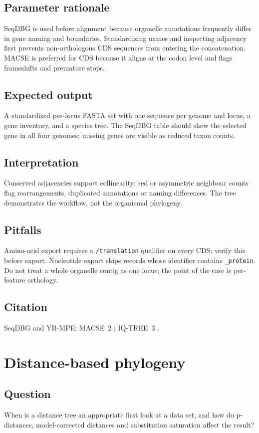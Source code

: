 \documentclass[11pt]{report}
\begin{document}
\section{Parameter rationale}
SeqDBG is used before alignment because organelle annotations frequently
differ in gene naming and boundaries. Standardizing names and inspecting
adjacency first prevents non-orthologous CDS sequences from entering the
concatenation. MACSE is preferred for CDS because it aligns at the codon
level and flags frameshifts and premature stops.

\section{Expected output}
A standardized per-locus FASTA set with one sequence per genome and locus, a
gene inventory, and a species tree. The SeqDBG table should show the selected
gene in all four genomes; missing genes are visible as reduced taxon counts.

\section{Interpretation}
Conserved adjacencies support collinearity; red or asymmetric neighbour
counts flag rearrangements, duplicated annotations or naming differences.
The tree demonstrates the workflow, not the organismal phylogeny.

\section{Pitfalls}
Amino-acid export requires a \texttt{/translation} qualifier on every CDS;
verify this before export. Nucleotide export skips records whose identifier
contains \texttt{\_protein}. Do not treat a whole organelle contig as one
locus; the point of the case is per-feature orthology.

\section{Citation}
SeqDBG and YR-MPE; MACSE~2 \cite{macse}; IQ-TREE~3
\cite{iqtree3}.

\chapter{Distance-based phylogeny}
\section{Question}
When is a distance tree an appropriate first look at a data set, and how do
p-distances, model-corrected distances and substitution saturation affect the
result?
\end{document}
